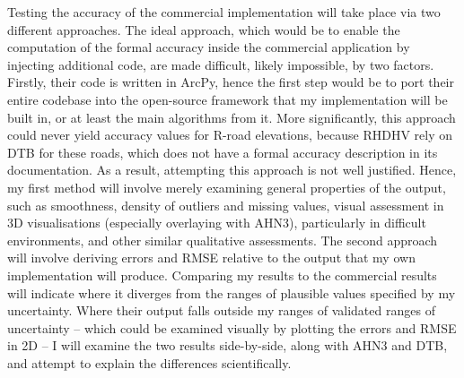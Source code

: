 Testing the accuracy of the commercial implementation will take place via two different approaches. The ideal approach, which would be to enable the computation of the formal accuracy inside the commercial application by injecting additional code, are made difficult, likely impossible, by two factors. Firstly, their code is written in ArcPy, hence the first step would be to port their entire codebase into the open-source framework that my implementation will be built in, or at least the main algorithms from it. More significantly, this approach could never yield accuracy values for R-road elevations, because RHDHV rely on DTB for these roads, which does not have a formal accuracy description in its documentation. As a result, attempting this approach is not well justified. Hence, my first method will involve merely examining general properties of the output, such as smoothness, density of outliers and missing values, visual assessment in 3D visualisations (especially overlaying with AHN3), particularly in difficult environments, and other similar qualitative assessments. The second approach will involve deriving errors and RMSE relative to the output that my own implementation will produce. Comparing my results to the commercial results will indicate where it diverges from the ranges of plausible values specified by my uncertainty. Where their output falls outside my ranges of validated ranges of uncertainty – which could be examined visually by plotting the errors and RMSE in 2D – I will examine the two results side-by-side, along with AHN3 and DTB, and attempt to explain the differences scientifically. 